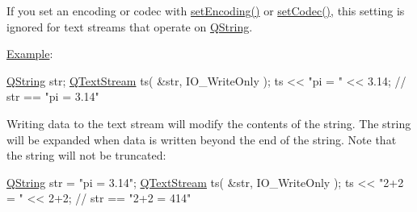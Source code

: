 If you set an encoding or codec with \hyperlink{class_q_text_stream_a0dcb70ff23e690c42a8c52280fa39d78}{set\-Encoding()} or \hyperlink{class_q_text_stream_a8a99d406850292fd277366f67c365937}{set\-Codec()}, this setting is ignored for text streams that operate on \hyperlink{class_q_string}{Q\-String}.

\hyperlink{struct_example}{Example}\-: 
\begin{DoxyCode}
\hyperlink{class_q_string}{QString} str;
\hyperlink{class_q_text_stream}{QTextStream} ts( &str, IO\_WriteOnly );
ts << \textcolor{stringliteral}{"pi = "} << 3.14;            \textcolor{comment}{// str == "pi = 3.14"}
\end{DoxyCode}


Writing data to the text stream will modify the contents of the string. The string will be expanded when data is written beyond the end of the string. Note that the string will not be truncated\-: 
\begin{DoxyCode}
\hyperlink{class_q_string}{QString} str = \textcolor{stringliteral}{"pi = 3.14"};
\hyperlink{class_q_text_stream}{QTextStream} ts( &str, IO\_WriteOnly );
ts <<  \textcolor{stringliteral}{"2+2 = "} << 2+2;       \textcolor{comment}{// str == "2+2 = 414"}
\end{DoxyCode}


